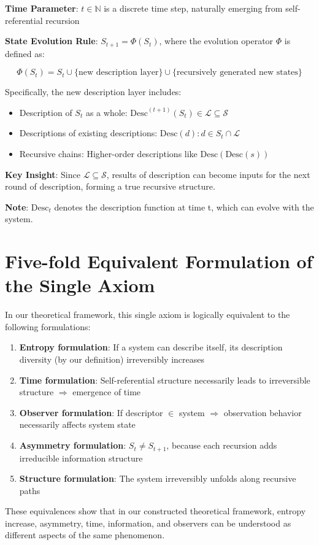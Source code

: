 \textbf{Time Parameter}: $t \in \mathbb{N}$ is a discrete time step, naturally emerging from self-referential recursion

\textbf{State Evolution Rule}: $S_{t+1} = \Phi(S_t)$, where the evolution operator $\Phi$ is defined as:

\begin{equation}
\Phi(S_t) = S_t \cup \{\text{new description layer}\} \cup \{\text{recursively generated new states}\}
\end{equation}

Specifically, the new description layer includes:
\begin{itemize}
\item Description of $S_t$ as a whole: $\text{Desc}^{(t+1)}(S_t) \in \mathcal{L} \subseteq \mathcal{S}$
\item Descriptions of existing descriptions: ${\text{Desc}(d) : d \in S_t \cap \mathcal{L}}$
\item Recursive chains: Higher-order descriptions like $\text{Desc}(\text{Desc}(s))$
\end{itemize}

\textbf{Key Insight}: Since $\mathcal{L} \subseteq \mathcal{S}$, results of description can become inputs for the next round of description, forming a true recursive structure.

\textbf{Note}: $\text{Desc}_t$ denotes the description function at time t, which can evolve with the system.

\section{Five-fold Equivalent Formulation of the Single Axiom}
\label{sec:ch02_axiom:five-fold-equivalent-formulation-of-the-single-axiom}

In our theoretical framework, this single axiom is logically equivalent to the following formulations:

\begin{enumerate}
\item \textbf{Entropy formulation}: If a system can describe itself, its description diversity (by our definition) irreversibly increases
\item \textbf{Time formulation}: Self-referential structure necessarily leads to irreversible structure $\Rightarrow$ emergence of time
\item \textbf{Observer formulation}: If descriptor $\in$ system $\Rightarrow$ observation behavior necessarily affects system state
\item \textbf{Asymmetry formulation}: $S_t \neq S_{t+1}$, because each recursion adds irreducible information structure
\item \textbf{Structure formulation}: The system irreversibly unfolds along recursive paths
\end{enumerate}

These equivalences show that in our constructed theoretical framework, entropy increase, asymmetry, time, information, and observers can be understood as different aspects of the same phenomenon.

